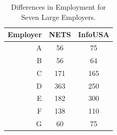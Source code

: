 \documentclass[paper = letter, fontsize = 11pt]{scrartcl}
\begin{document}
\clearpage
\pagestyle{plain}
\begin{table}[h]
	\begin{center}
		\begin{tabular}{ r | c c }
			Employer & NETS & InfoUSA \\
			\hline
			\hline
			A & 56 & 75 \\
			\hline 
			B & 56 & 64 \\
			\hline 
			C & 171 & 165 \\
			\hline
			D & 363 & 250 \\
			\hline 
			E & 182 & 300 \\
			\hline 
			F & 138 & 110 \\
			\hline 
			G & 60 & 75 \\
			\hline
		\end{tabular}
	\end{center}
	\caption{Differences in Employment for Seven Large Employers.}
\end{table}
\end{document}
